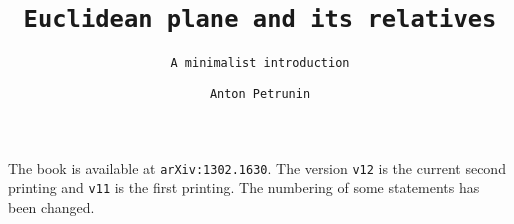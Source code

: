 \title{\tt Euclidean plane and its relatives}
\subtitle{\tt A minimalist introduction}
\author{\tt Anton Petrunin}
\date{}
\maketitle

The book is available at \texttt{arXiv:1302.1630}.
The version \texttt{v12} is
the current second printing and \texttt{v11} is the first printing.
The numbering of some statements has been changed.




\null\vfill{}




\thispagestyle{empty}
\newpage
\tableofcontents